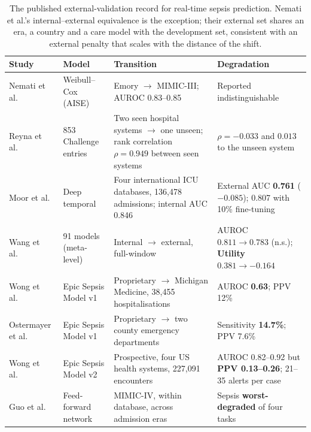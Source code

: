\begin{table}[H]
    \centering\small
    \begin{tabularx}{\textwidth}{p{2.6cm}p{2.5cm}Xp{2.9cm}}
    \toprule
    \textbf{Study} & \textbf{Model} & \textbf{Transition} &
    \textbf{Degradation} \\
    \midrule
    Nemati et al.\ \cite{nemati2018aise} & Weibull--Cox (AISE) &
    Emory $\rightarrow$ MIMIC-III; AUROC 0.83--0.85 &
    Reported indistinguishable \\
    \addlinespace
    Reyna et al.\ \cite{reyna2020utility} & 853 Challenge entries &
    Two seen hospital systems $\rightarrow$ one unseen; rank correlation
    $\rho = 0.949$ between seen systems &
    $\rho = -0.033$ and $0.013$ to the unseen system \\
    \addlinespace
    Moor et al.\ \cite{moor2023review} & Deep temporal &
    Four international ICU databases, 136,478 admissions; internal AUC 0.846 &
    External AUC \textbf{0.761} ($-0.085$); 0.807 with 10\% fine-tuning \\
    \addlinespace
    Wang et al.\ \cite{wang2025srpm} & 91 models (meta-level) &
    Internal $\rightarrow$ external, full-window &
    AUROC $0.811 \rightarrow 0.783$ (n.s.); \textbf{Utility
    $0.381 \rightarrow -0.164$} \\
    \addlinespace
    Wong et al.\ \cite{wong2021epic} & Epic Sepsis Model v1 &
    Proprietary $\rightarrow$ Michigan Medicine, 38,455 hospitalisations &
    AUROC \textbf{0.63}; PPV 12\% \\
    \addlinespace
    Ostermayer et al.\ \cite{ostermayer2024external} & Epic Sepsis Model v1 &
    Proprietary $\rightarrow$ two county emergency departments &
    Sensitivity \textbf{14.7\%}; PPV 7.6\% \\
    \addlinespace
    Wong et al.\ \cite{wong2026epic} & Epic Sepsis Model v2 &
    Prospective, four US health systems, 227,091 encounters &
    AUROC 0.82--0.92 but \textbf{PPV 0.13--0.26}; 21--35 alerts per case \\
    \addlinespace
    Guo et al.\ \cite{guo2022temporal} & Feed-forward network &
    MIMIC-IV, within database, across admission eras &
    Sepsis \textbf{worst-degraded} of four tasks \\
    \bottomrule
    \end{tabularx}
    \caption{The published external-validation record for real-time sepsis
    prediction. Nemati et al.'s internal--external equivalence is the exception;
    their external set shares an era, a country and a care model with the
    development set, consistent with an external penalty that scales with the
    distance of the shift.}
    \label{tab:generalisation}
\end{table}

